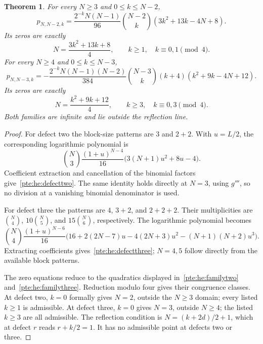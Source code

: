 \documentclass[11pt,a4paper]{article}
\numberwithin{equation}{section}
\newtheorem{theorem}{Theorem}[section]
\theoremstyle{definition}
\theoremstyle{plain}
\begin{document}
\begin{theorem}\label{pte:he:families}
For every $N\ge3$ and $0\le k\le N-2$,
\begin{equation}\label{pte:he:defecttwo}
 p_{N,N-2,k}=\frac{2^{-k}N(N-1)}{96}\binom{N-2}k
                         (3k^2+13k-4N+8).
\end{equation}
Its zeros are exactly
\begin{equation}\label{pte:he:familytwo}
 N=\frac{3k^2+13k+8}{4},\qquad
 k\ge1,\quad k\equiv0,1\pmod4.
\end{equation}
For every $N\ge4$ and $0\le k\le N-3$,
\begin{equation}\label{pte:he:defectthree}
 p_{N,N-3,k}=-\frac{2^{-k}N(N-1)(N-2)}{384}\binom{N-3}k
                   (k+4)(k^2+9k-4N+12).
\end{equation}
Its zeros are exactly
\begin{equation}\label{pte:he:familythree}
 N=\frac{k^2+9k+12}{4},\qquad
 k\ge3,\quad k\equiv0,3\pmod4.
\end{equation}
Both families are infinite and lie outside the reflection line.
\end{theorem}
\begin{proof}
For defect two the block-size patterns are $3$ and $2+2$. With $u=L/2$, the corresponding logarithmic polynomial is
\[
 \binom N3\frac{(1+u)^{N-4}}{16}
       \bigl(3(N+1)u^2+8u-4\bigr).
\]
Coefficient extraction and cancellation of the binomial factors give~\eqref{pte:he:defecttwo}. The same identity holds directly at $N=3$, using $g'''$, so no division at a vanishing binomial denominator is used.

For defect three the patterns are $4$, $3+2$, and $2+2+2$. Their multiplicities are $\binom N4$, $10\binom N5$, and $15\binom N6$, respectively. The logarithmic polynomial becomes
\[
 \binom N4\frac{(1+u)^{N-6}}{16}
 \bigl(16+2(2N-7)u-4(2N+3)u^2-(N+1)(N+2)u^3\bigr).
\]
Extracting coefficients gives~\eqref{pte:he:defectthree}; $N=4,5$ follow directly from the available block patterns.

The zero equations reduce to the quadratics displayed in~\eqref{pte:he:familytwo} and~\eqref{pte:he:familythree}. Reduction modulo four gives their congruence classes. At defect two, $k=0$ formally gives $N=2$, outside the $N\ge3$ domain; every listed $k\ge1$ is admissible. At defect three, $k=0$ gives $N=3$, outside $N\ge4$; the listed $k\ge3$ are all admissible. The reflection condition is $N=(k+2d)/2+1$, which at defect $r$ reads $r+k/2=1$. It has no admissible point at defects two or three.
\end{proof}
\end{document}
